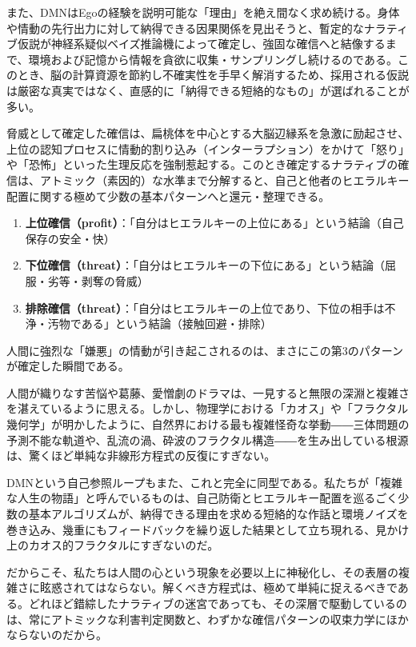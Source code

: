 また、DMNはEgoの経験を説明可能な「理由」を絶え間なく求め続ける。身体や情動の先行出力に対して納得できる因果関係を見出そうと、暫定的なナラティブ仮説が神経系疑似ベイズ推論機によって確定し、強固な確信へと結像するまで、環境および記憶から情報を貪欲に収集・サンプリングし続けるのである。このとき、脳の計算資源を節約し不確実性を手早く解消するため、採用される仮説は厳密な真実ではなく、直感的に「納得できる短絡的なもの」が選ばれることが多い。

脅威として確定した確信は、扁桃体を中心とする大脳辺縁系を急激に励起させ、上位の認知プロセスに情動的割り込み（インターラプション）をかけて「怒り」や「恐怖」といった生理反応を強制惹起する。このとき確定するナラティブの確信は、アトミック（素因的）な水準まで分解すると、自己と他者のヒエラルキー配置に関する極めて少数の基本パターンへと還元・整理できる。

\begin{enumerate}[label=(\arabic*)]
\item \textbf{上位確信（profit）}：「自分はヒエラルキーの上位にある」という結論（自己保存の安全・快）
\item \textbf{下位確信（threat）}：「自分はヒエラルキーの下位にある」という結論（屈服・劣等・剥奪の脅威）
\item \textbf{排除確信（threat）}：「自分はヒエラルキーの上位であり、下位の相手は不浄・汚物である」という結論（接触回避・排除）
\end{enumerate}

人間に強烈な「嫌悪」の情動が引き起こされるのは、まさにこの第3のパターンが確定した瞬間である。

人間が織りなす苦悩や葛藤、愛憎劇のドラマは、一見すると無限の深淵と複雑さを湛えているように思える。しかし、物理学における「カオス」や「フラクタル幾何学」が明かしたように、自然界における最も複雑怪奇な挙動――三体問題の予測不能な軌道や、乱流の渦、砕波のフラクタル構造――を生み出している根源は、驚くほど単純な非線形方程式の反復にすぎない。

DMNという自己参照ループもまた、これと完全に同型である。私たちが「複雑な人生の物語」と呼んでいるものは、自己防衛とヒエラルキー配置を巡るごく少数の基本アルゴリズムが、納得できる理由を求める短絡的な作話と環境ノイズを巻き込み、幾重にもフィードバックを繰り返した結果として立ち現れる、見かけ上のカオス的フラクタルにすぎないのだ。

だからこそ、私たちは人間の心という現象を必要以上に神秘化し、その表層の複雑さに眩惑されてはならない。解くべき方程式は、極めて単純に捉えるべきである。どれほど錯綜したナラティブの迷宮であっても、その深層で駆動しているのは、常にアトミックな利害判定関数と、わずかな確信パターンの収束力学にほかならないのだから。

